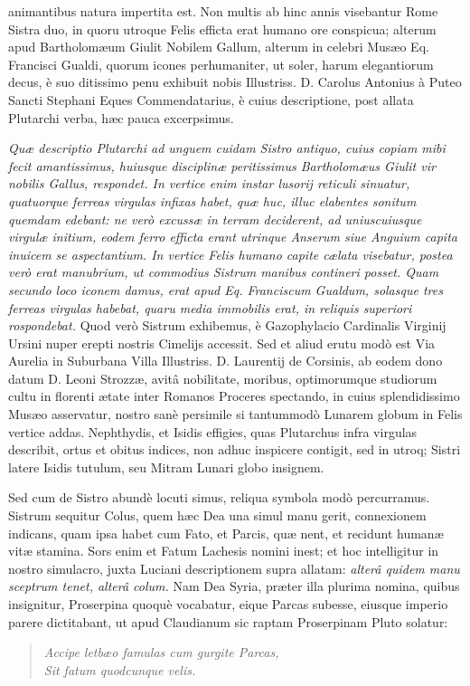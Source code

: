 \documentclass[a4paper, 11pt, oneside, polutonikogreek, latin]{article}
\begin{document}
animantibus natura impertita est. Non multis ab hinc annis visebantur Rome Sistra duo, in quoru utroque Felis efficta erat humano ore conspicua; alterum apud Bartholomæum Giulit Nobilem Gallum, alterum in celebri Musæo Eq. Francisci Gualdi, quorum icones perhumaniter, ut soler, harum elegantiorum decus, è suo ditissimo penu exhibuit nobis Illustriss. D. Carolus Antonius à Puteo Sancti Stephani Eques Commendatarius, è cuius descriptione, post allata Plutarchi verba, hæc pauca excerpsimus.

\emph{Quæ descriptio Plutarchi ad unguem cuidam Sistro antiquo, cuius copiam mibi fecit amantissimus, huiusque disciplinæ peritissimus Bartholomæus Giulit vir nobilis Gallus, respondet. In vertice enim instar lusorij reticuli sinuatur, quatuorque ferreas virgulas infixas habet, quæ huc, illuc elabentes sonitum quemdam edebant: ne verò excussæ in terram deciderent, ad uniuscuiusque virgulæ initium, eodem ferro efficta erant utrinque Anserum siue Anguium capita inuicem se aspectantium. In vertice Felis humano capite cælata visebatur, postea verò erat manubrium, ut commodius Sistrum manibus contineri posset. Quam secundo loco iconem damus, erat apud Eq. Franciscum Gualdum, solasque tres ferreas virgulas habebat, quaru media immobilis erat, in reliquis superiori rospondebat.} Quod verò Sistrum exhibemus, è Gazophylacio Cardinalis Virginij Ursini nuper erepti nostris Cimelijs accessit. Sed et aliud erutu modò est Via Aurelia in Suburbana Villa Illustriss. D. Laurentij de Corsinis, ab eodem dono datum D. Leoni Strozzæ, avitâ nobilitate, moribus, optimorumque studiorum cultu in florenti ætate inter Romanos Proceres spectando, in cuius splendidissimo Musæo asservatur, nostro sanè persimile si tantummodò Lunarem globum in Felis vertice addas. Nephthydis, et Isidis effigies, quas Plutarchus infra virgulas describit, ortus et obitus indices, non adhuc inspicere contigit, sed in utroq; Sistri latere Isidis tutulum, seu Mitram Lunari globo insignem.

Sed cum de Sistro abundè locuti simus, reliqua symbola modò percurramus. Sistrum sequitur Colus, quem hæc Dea una simul manu gerit, connexionem indicans, quam ipsa habet cum Fato, et Parcis, quæ nent, et recidunt humanæ vitæ stamina. Sors enim et Fatum Lachesis nomini inest; et hoc intelligitur in nostro simulacro, juxta Luciani descriptionem supra allatam: \emph{alterâ quidem manu sceptrum tenet, alterâ colum.} Nam Dea Syria, præter illa plurima nomina, quibus insignitur, Proserpina quoquè vocabatur, eique Parcas subesse, eiusque imperio parere dictitabant, ut apud Claudianum sic raptam Proserpinam Pluto solatur:
\begin{quote}
\emph{Accipe letbæo famulas cum gurgite Parcas,}\\
\emph{Sit fatum quodcunque velis.}\\
\end{quote}
\vspace*{-8mm}
\end{document}
